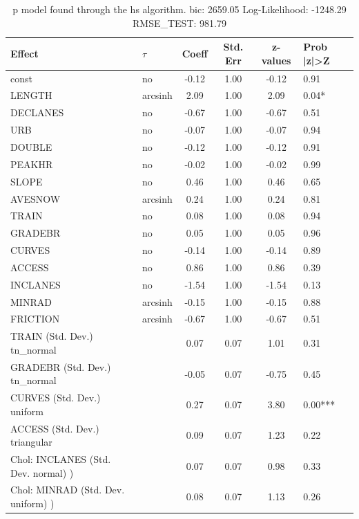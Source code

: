 \begin{table}
	\caption{p model found through the hs algorithm. bic: 2659.05 Log-Likelihood: -1248.29 RMSE_TEST: 981.79}
	\begin{center}
		\begin{tabular}{|l|l|c|c|c|l|}
			\hline
			Effect & $\tau$ & Coeff & Std. Err & z-values & Prob |z|>Z \\
			\hline
			const & no & -0.12 & 1.00 & -0.12 & 0.91 \\
			\hline
			LENGTH & arcsinh & 2.09 & 1.00 & 2.09 & 0.04* \\
			\hline
			DECLANES & no & -0.67 & 1.00 & -0.67 & 0.51 \\
			\hline
			URB & no & -0.07 & 1.00 & -0.07 & 0.94 \\
			\hline
			DOUBLE & no & -0.12 & 1.00 & -0.12 & 0.91 \\
			\hline
			PEAKHR & no & -0.02 & 1.00 & -0.02 & 0.99 \\
			\hline
			SLOPE & no & 0.46 & 1.00 & 0.46 & 0.65 \\
			\hline
			AVESNOW & arcsinh & 0.24 & 1.00 & 0.24 & 0.81 \\
			\hline
			TRAIN & no & 0.08 & 1.00 & 0.08 & 0.94 \\
			\hline
			GRADEBR & no & 0.05 & 1.00 & 0.05 & 0.96 \\
			\hline
			CURVES & no & -0.14 & 1.00 & -0.14 & 0.89 \\
			\hline
			ACCESS & no & 0.86 & 1.00 & 0.86 & 0.39 \\
			\hline
			INCLANES & no & -1.54 & 1.00 & -1.54 & 0.13 \\
			\hline
			MINRAD & arcsinh & -0.15 & 1.00 & -0.15 & 0.88 \\
			\hline
			FRICTION & arcsinh & -0.67 & 1.00 & -0.67 & 0.51 \\
			\hline
			TRAIN (Std. Dev.) tn_normal &  & 0.07 & 0.07 & 1.01 & 0.31 \\
			\hline
			GRADEBR (Std. Dev.) tn_normal &  & -0.05 & 0.07 & -0.75 & 0.45 \\
			\hline
			CURVES (Std. Dev.) uniform &  & 0.27 & 0.07 & 3.80 & 0.00*** \\
			\hline
			ACCESS (Std. Dev.) triangular &  & 0.09 & 0.07 & 1.23 & 0.22 \\
			\hline
			 Chol: INCLANES (Std. Dev. normal) ) &  & 0.07 & 0.07 & 0.98 & 0.33 \\
			\hline
			 Chol: MINRAD (Std. Dev. uniform) ) &  & 0.08 & 0.07 & 1.13 & 0.26 \\

\end{tabular}
\end{center}
\end{table}
